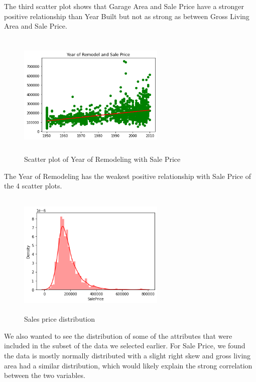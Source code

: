 \documentclass[fleqn,10pt]{SelfArx} %
\begin{document}
The third scatter plot shows that Garage Area and Sale Price have a stronger positive relationship than Year Built but not as strong as between Gross Living Area and Sale Price.
\begin{figure}[H]
    \centering
    \includegraphics[width=7cm, height=6cm]{img/YearofRemodelscatter.png}
    \caption{Scatter plot of Year of Remodeling with Sale Price}
    \label{fig:my_label}
\end{figure}
The Year of Remodeling has the weakest positive relationship with Sale Price of the 4 scatter plots. 

\begin{figure}[H]
    \centering
    \includegraphics[width=7cm, height=6cm]{img/saleshist.png}
    \caption{Sales price distribution}
    \label{fig:my_label}
\end{figure}
We also wanted to see the distribution of some of the attributes that were included in the subset of the data we selected earlier. For Sale Price, we found the data is mostly normally distributed with a slight right skew and gross living area had a similar distribution, which would likely explain the strong correlation between the two variables. 
\end{document}
